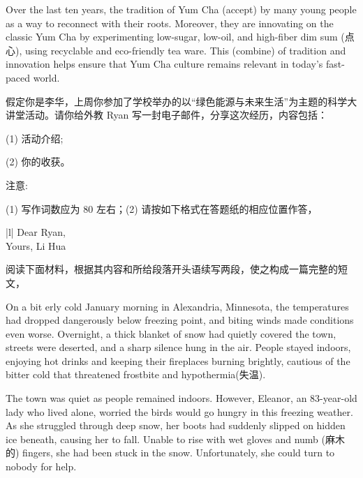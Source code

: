 \documentclass{英语试卷}
\begin{document}
\par Over the last ten years, the tradition of Yum Cha  (accept) by many young people as a way to reconnect with their roots. Moreover, they are innovating on the classic Yum Cha by experimenting  low-sugar, low-oil, and high-fiber dim sum (点心), using recyclable and eco-friendly tea ware. This  (combine) of tradition and innovation helps ensure that Yum Cha culture remains relevant in today's fast-paced world.\par
{}
\par 假定你是李华，上周你参加了学校举办的以“绿色能源与未来生活”为主题的科学大讲堂活动。请你给外教 Ryan 写一封电子邮件，分享这次经历，内容包括：\par
\par (1) 活动介绍;\par
\par (2) 你的收获。\par
\par 注意:\par
\par (1) 写作词数应为 80 左右；(2) 请按如下格式在答题纸的相应位置作答，\par
\par\vspace{0.4em}
\begin{center}\begin{tabular}{{|l|}}
\hline
Dear Ryan, \\
Yours, Li Hua \\
\hline
\end{tabular}\end{center}
\vspace{0.4em}
\par 阅读下面材料，根据其内容和所给段落开头语续写两段，使之构成一篇完整的短文，\par
\par On a bit erly cold January morning in Alexandria, Minnesota, the temperatures had dropped dangerously below freezing point, and biting winds made conditions even worse. Overnight, a thick blanket of snow had quietly covered the town, streets were deserted, and a sharp silence hung in the air. People stayed indoors, enjoying hot drinks and keeping their fireplaces burning brightly, cautious of the bitter cold that threatened frostbite and hypothermia(失温).\par
\par The town was quiet as people remained indoors. However, Eleanor, an 83-year-old lady who lived alone, worried the birds would go hungry in this freezing weather. As she struggled through deep snow, her boots had suddenly slipped on hidden ice beneath, causing her to fall. Unable to rise with wet gloves and numb (麻木的) fingers, she had been stuck in the snow. Unfortunately, she could turn to nobody for help.\par
\end{document}
